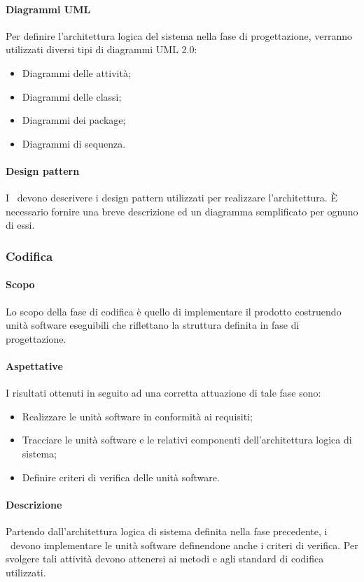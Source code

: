 \documentclass[../NormeDiProgetto.tex]{subfiles}
\begin{document}
			\paragraph{Diagrammi UML\\}
				Per definire l'architettura logica del sistema nella fase di progettazione,
				verranno utilizzati	diversi tipi di diagrammi UML 2.0:
				\begin{itemize}
					\item Diagrammi delle attività;
					\item Diagrammi delle classi;
					\item Diagrammi dei package;
					\item Diagrammi di sequenza.
				\end{itemize}
			\paragraph{Design pattern\\}
				I \progettisti\ devono descrivere i design pattern utilizzati per realizzare l'architettura.
				È necessario fornire una breve descrizione ed un diagramma semplificato per ognuno di essi.
		\subsubsection{Codifica}
			\paragraph{Scopo\\}
				Lo scopo della fase di codifica è quello di implementare il prodotto costruendo
				unità software eseguibili che riflettano la struttura definita in fase di
				progettazione.
			\paragraph{Aspettative\\}
				I risultati ottenuti in seguito ad una corretta attuazione di tale fase sono:
				\begin{itemize}
					\item Realizzare le unità software in conformità ai requisiti;
					\item Tracciare le unità software e le relativi componenti dell'architettura
					logica di sistema;
					\item Definire criteri di verifica delle unità software.
				\end{itemize}
			\paragraph{Descrizione\\}
				Partendo dall'architettura logica di sistema definita nella fase precedente, i
				\programmatori\ devono implementare le unità software definendone anche i criteri di
				verifica. Per svolgere tali attività devono attenersi ai metodi e
				agli standard di codifica utilizzati.
\end{document}
